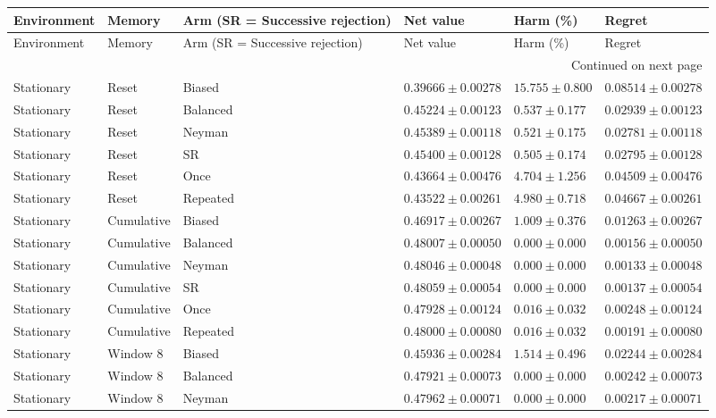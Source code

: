 \begin{longtable}{@{}llllll@{}}
\toprule Environment & Memory & Arm (SR = Successive rejection) & Net value & Harm (\%) & Regret \\\midrule\endfirsthead
\toprule Environment & Memory & Arm (SR = Successive rejection) & Net value & Harm (\%) & Regret \\\midrule\endhead
\midrule\multicolumn{6}{r}{Continued on next page}\\\endfoot
\bottomrule\endlastfoot
Stationary & Reset & Biased & $0.39666 \pm 0.00278$ & $15.755 \pm 0.800$ & $0.08514 \pm 0.00278$ \\
Stationary & Reset & Balanced & $0.45224 \pm 0.00123$ & $0.537 \pm 0.177$ & $0.02939 \pm 0.00123$ \\
Stationary & Reset & Neyman & $0.45389 \pm 0.00118$ & $0.521 \pm 0.175$ & $0.02781 \pm 0.00118$ \\
Stationary & Reset & SR & $0.45400 \pm 0.00128$ & $0.505 \pm 0.174$ & $0.02795 \pm 0.00128$ \\
Stationary & Reset & Once & $0.43664 \pm 0.00476$ & $4.704 \pm 1.256$ & $0.04509 \pm 0.00476$ \\
Stationary & Reset & Repeated & $0.43522 \pm 0.00261$ & $4.980 \pm 0.718$ & $0.04667 \pm 0.00261$ \\
Stationary & Cumulative & Biased & $0.46917 \pm 0.00267$ & $1.009 \pm 0.376$ & $0.01263 \pm 0.00267$ \\
Stationary & Cumulative & Balanced & $0.48007 \pm 0.00050$ & $0.000 \pm 0.000$ & $0.00156 \pm 0.00050$ \\
Stationary & Cumulative & Neyman & $0.48046 \pm 0.00048$ & $0.000 \pm 0.000$ & $0.00133 \pm 0.00048$ \\
Stationary & Cumulative & SR & $0.48059 \pm 0.00054$ & $0.000 \pm 0.000$ & $0.00137 \pm 0.00054$ \\
Stationary & Cumulative & Once & $0.47928 \pm 0.00124$ & $0.016 \pm 0.032$ & $0.00248 \pm 0.00124$ \\
Stationary & Cumulative & Repeated & $0.48000 \pm 0.00080$ & $0.016 \pm 0.032$ & $0.00191 \pm 0.00080$ \\
Stationary & Window 8 & Biased & $0.45936 \pm 0.00284$ & $1.514 \pm 0.496$ & $0.02244 \pm 0.00284$ \\
Stationary & Window 8 & Balanced & $0.47921 \pm 0.00073$ & $0.000 \pm 0.000$ & $0.00242 \pm 0.00073$ \\
Stationary & Window 8 & Neyman & $0.47962 \pm 0.00071$ & $0.000 \pm 0.000$ & $0.00217 \pm 0.00071$ \\

\end{longtable}
